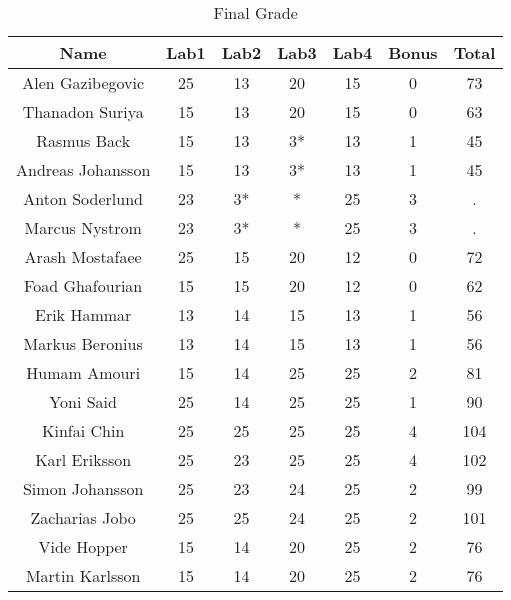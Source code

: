 \documentclass{article}
\begin{document}
\begin{table}[ht]
\caption{Final Grade}
\centering
\begin{tabular}{c c c c c c c} 
\hline\hline 
Name & Lab1 & Lab2 & Lab3 & Lab4 & Bonus & Total \\ [0.5ex] 
\hline
Alen Gazibegovic 
& 25 & 13 & 20 & 15 & 0 & 73 \\
\hline
Thanadon Suriya 
& 15 & 13 & 20 & 15 & 0 & 63 \\
\hline
Rasmus Back 
& 15 & 13 & 3* & 13 & 1 & 45 \\
\hline 
Andreas Johansson
& 15 & 13 & 3* & 13 & 1 & 45 \\
\hline 
Anton Soderlund
& 23 & 3* & * & 25 & 3 & . \\
\hline 
Marcus Nystrom
& 23 & 3* & * & 25 & 3 & . \\
\hline
Arash Mostafaee
& 25 & 15 & 20 & 12 & 0 & 72 \\
\hline
Foad Ghafourian
& 15 & 15 & 20 & 12 & 0 & 62 \\
\hline
Erik Hammar
& 13 & 14 & 15 & 13 & 1 & 56 \\
\hline
Markus Beronius
& 13 & 14 & 15 & 13 & 1 & 56 \\
\hline 
Humam Amouri
& 15 & 14 & 25 & 25 & 2 & 81 \\
\hline 
Yoni Said
& 25 & 14 & 25 & 25 & 1 & 90 \\  
\hline
Kinfai Chin
& 25 & 25 & 25 & 25 & 4 & 104 \\
\hline
Karl Eriksson
& 25 & 23 & 25 & 25 & 4 & 102 \\ 
\hline
Simon Johansson
& 25 & 23 & 24 & 25 & 2 & 99 \\
\hline
Zacharias Jobo
& 25 & 25 & 24 & 25 & 2 & 101 \\
\hline
Vide Hopper
& 15 & 14 & 20 & 25 & 2 & 76 \\ [1ex]
\hline
Martin Karlsson
& 15 & 14 & 20 & 25 & 2 & 76 \\
\hline
\end{tabular}
\label{table:nonlin}
\end{table}
\end{document}
